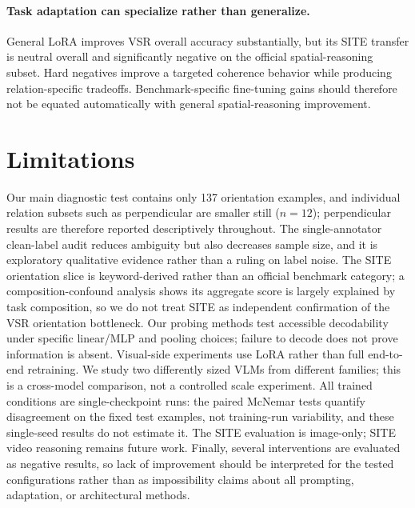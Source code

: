 \paragraph{Task adaptation can specialize rather than generalize.}
General LoRA improves VSR overall accuracy substantially, but its SITE transfer is neutral overall and significantly negative on the official spatial-reasoning subset. Hard negatives improve a targeted coherence behavior while producing relation-specific tradeoffs. Benchmark-specific fine-tuning gains should therefore not be equated automatically with general spatial-reasoning improvement.

\section{Limitations}
Our main diagnostic test contains only 137 orientation examples, and individual relation subsets such as perpendicular are smaller still ($n{=}12$); perpendicular results are therefore reported descriptively throughout. The single-annotator clean-label audit reduces ambiguity but also decreases sample size, and it is exploratory qualitative evidence rather than a ruling on label noise. The SITE orientation slice is keyword-derived rather than an official benchmark category; a composition-confound analysis shows its aggregate score is largely explained by task composition, so we do not treat SITE as independent confirmation of the VSR orientation bottleneck. Our probing methods test accessible decodability under specific linear/MLP and pooling choices; failure to decode does not prove information is absent. Visual-side experiments use LoRA rather than full end-to-end retraining. We study two differently sized VLMs from different families; this is a cross-model comparison, not a controlled scale experiment. All trained conditions are single-checkpoint runs: the paired McNemar tests quantify disagreement on the fixed test examples, not training-run variability, and these single-seed results do not estimate it. The SITE evaluation is image-only; SITE video reasoning remains future work. Finally, several interventions are evaluated as negative results, so lack of improvement should be interpreted for the tested configurations rather than as impossibility claims about all prompting, adaptation, or architectural methods.

